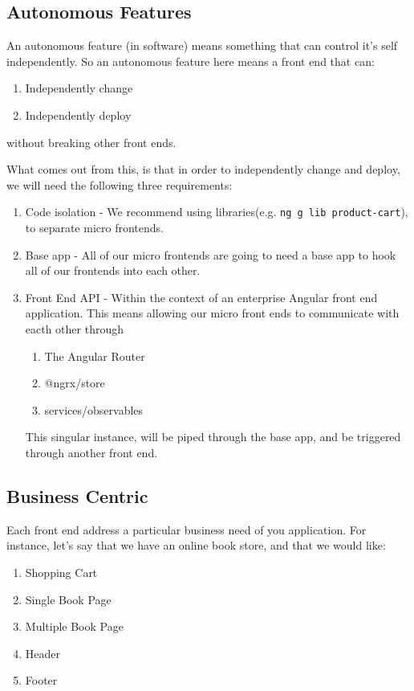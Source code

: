 \subsection{Autonomous Features}
An autonomous feature (in software) means something that can control it's self independently. So an autonomous feature here means a front end that can:
\begin{enumerate}
  \item Independently change 
  \item Independently deploy 
\end{enumerate}
without breaking other front ends. 

What comes out from this, is that in order to independently change and deploy, we will need the following three requirements: 
\begin{enumerate}
  \item Code isolation - We recommend using libraries(e.g. \lstinline{ng g lib product-cart}), to separate micro frontends.
  \item Base app - All of our micro frontends are going to need a base app to hook all of our frontends into each other.
  \item Front End API - Within the context of an enterprise Angular front end application. This means allowing our micro front ends to communicate with eacth other through 
  \begin{enumerate}
    \item The Angular Router
    \item @ngrx/store
    \item services/observables
  \end{enumerate}
  This singular instance, will be piped through the base app, and be triggered through another front end. 
\end{enumerate} 

\subsection{Business Centric}
Each front end address a particular business need of you application.
For instance, let's say that we have an online book store, and that we would like:
\begin{enumerate}
  \item Shopping Cart
  \item Single Book Page
  \item Multiple Book Page
  \item Header
  \item Footer 
\end{enumerate}

